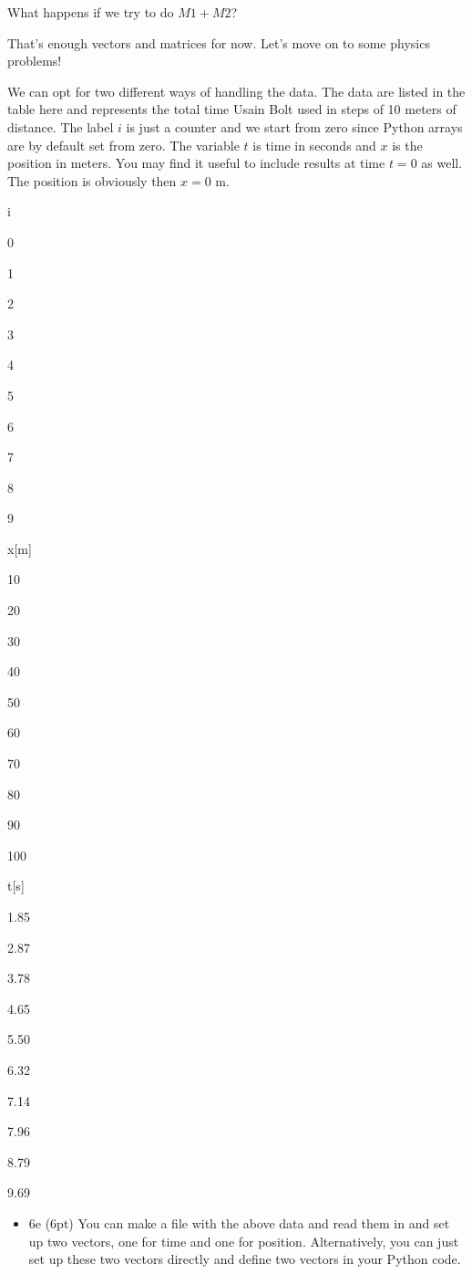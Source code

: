 \documentclass[11pt]{article}
\providecommand{\tightlist}{%
      \setlength{\itemsep}{0pt}\setlength{\parskip}{0pt}}
\begin{document}
    What happens if we try to do \(M1+M2\)?

That's enough vectors and matrices for now. Let's move on to some
physics problems!

We can opt for two different ways of handling the data. The data are
listed in the table here and represents the total time Usain Bolt used
in steps of 10 meters of distance. The label \(i\) is just a counter and
we start from zero since Python arrays are by default set from zero. The
variable \(t\) is time in seconds and \(x\) is the position in meters.
You may find it useful to include results at time \(t=0\) as well. The
position is obviously then \(x=0\) m.

i

0

1

2

3

4

5

6

7

8

9

x{[}m{]}

10

20

30

40

50

60

70

80

90

100

t{[}s{]}

1.85

2.87

3.78

4.65

5.50

6.32

7.14

7.96

8.79

9.69

\begin{itemize}
\tightlist
\item
  6e (6pt) You can make a file with the above data and read them in and
  set up two vectors, one for time and one for position. Alternatively,
  you can just set up these two vectors directly and define two vectors
  in your Python code.
\end{itemize}
\end{document}
